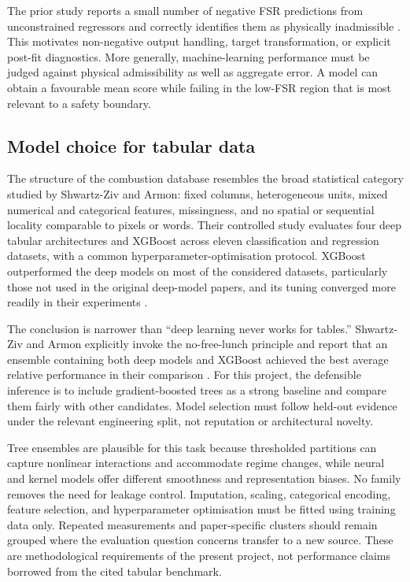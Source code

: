 The prior study reports a small number of negative FSR predictions from unconstrained regressors and correctly identifies them as physically inadmissible \cite{riveraWireML}. This motivates non-negative output handling, target transformation, or explicit post-fit diagnostics. More generally, machine-learning performance must be judged against physical admissibility as well as aggregate error. A model can obtain a favourable mean score while failing in the low-FSR region that is most relevant to a safety boundary.

\subsection{Model choice for tabular data}

The structure of the combustion database resembles the broad statistical category studied by Shwartz-Ziv and Armon: fixed columns, heterogeneous units, mixed numerical and categorical features, missingness, and no spatial or sequential locality comparable to pixels or words. Their controlled study evaluates four deep tabular architectures and XGBoost across eleven classification and regression datasets, with a common hyperparameter-optimisation protocol. XGBoost outperformed the deep models on most of the considered datasets, particularly those not used in the original deep-model papers, and its tuning converged more readily in their experiments \cite{shwartzZiv2022tabular}.

The conclusion is narrower than ``deep learning never works for tables.'' Shwartz-Ziv and Armon explicitly invoke the no-free-lunch principle and report that an ensemble containing both deep models and XGBoost achieved the best average relative performance in their comparison \cite{shwartzZiv2022tabular}. For this project, the defensible inference is to include gradient-boosted trees as a strong baseline and compare them fairly with other candidates. Model selection must follow held-out evidence under the relevant engineering split, not reputation or architectural novelty.

Tree ensembles are plausible for this task because thresholded partitions can capture nonlinear interactions and accommodate regime changes, while neural and kernel models offer different smoothness and representation biases. No family removes the need for leakage control. Imputation, scaling, categorical encoding, feature selection, and hyperparameter optimisation must be fitted using training data only. Repeated measurements and paper-specific clusters should remain grouped where the evaluation question concerns transfer to a new source. These are methodological requirements of the present project, not performance claims borrowed from the cited tabular benchmark.

